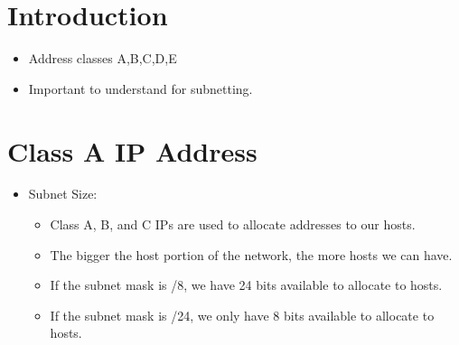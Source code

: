 \section{Introduction}
\begin{itemize}
    \item Address classes A,B,C,D,E
    \item Important to understand for subnetting.
\end{itemize}


\section{Class A IP Address}
\begin{itemize}
    \item Subnet Size:
        \begin{itemize}
            \item Class A, B, and C IPs are used to allocate addresses to our hosts.
            \item The bigger the host portion of the network, the more hosts we can have.
            \item If the subnet mask is /8, we have 24 bits available to allocate to hosts.
            \item If the subnet mask is /24, we only have 8 bits available to allocate to hosts.
        \end{itemize}
    

\end{itemize}
